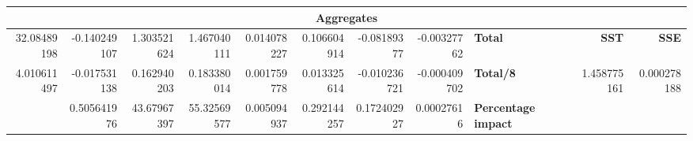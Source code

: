 \documentclass[11pt,a4paper]{article}
\begin{document}
{\begin{landscape}
{\begin{tabular}{|*{15}{r|}}
                \hline\multicolumn{15}{|c|}{\textbf{Aggregates}} \\
                \hline 32.08489198 & -0.140249107 & 1.303521624 & 1.467040111 & 0.014078227 & 0.106604914 & -0.08189377 & -0.00327762 & \multicolumn{3}{|l|}{\textbf{Total}} & \multicolumn{2}{|r|}{} & \textbf{SST} & \textbf{SSE} \\
                \hline 4.010611497 & -0.017531138 & 0.162940203 & 0.183380014 & 0.001759778 & 0.013325614 & -0.010236721 & -0.000409702 & \multicolumn{3}{|l|}{\textbf{Total/8}} & \multicolumn{2}{|r|}{} & 1.458775161 & 0.000278188 \\
                \hline & 0.505641976 & 43.67967397 & 55.32569577 & 0.005094937 & 0.292144257 & 0.172402927 & 0.00027616 & \multicolumn{3}{|l|}{\textbf{Percentage impact}} & \multicolumn{4}{|l|}{} \\
                \hline
            \end{tabular}
        }
        \label{table::ro_2k_through}

        \vspace{2cm}


\end{landscape}}
\end{document}
